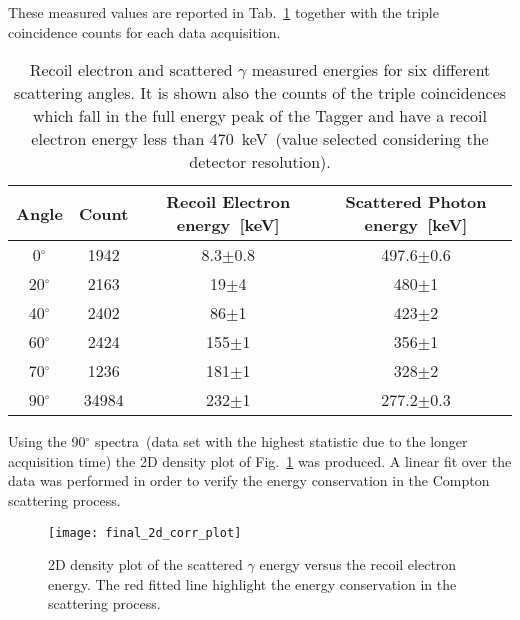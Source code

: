 These measured values are reported in Tab.~\ref{Tab:Scattering_energy} together with the triple coincidence counts for each data acquisition.

\begin{table}[H]
	\centering
	\begin{tabular}{cccc}
		\toprule
		\toprule
		Angle & Count & Recoil Electron energy~[keV] & Scattered Photon energy~[keV] \\
		\midrule
		  0$^\circ$ & 1942 &   8.3$\pm$0.8 &  497.6$\pm$0.6\\
		20$^\circ$ & 2163 &   19$\pm$4 &  480$\pm$1\\
		40$^\circ$ & 2402 &   86$\pm$1 &  423$\pm$2\\
		60$^\circ$ & 2424 & 155$\pm$1 &  356$\pm$1\\
		70$^\circ$ & 1236 & 181$\pm$1 &  328$\pm$2\\
		90$^\circ$ & 34984 & 232$\pm$1 &  277.2$\pm$0.3\\
		\bottomrule
		\bottomrule
	\end{tabular}
	\caption{Recoil electron and scattered $\gamma$ measured energies for six different scattering angles. It is shown also the counts of the triple coincidences which fall in the full energy peak of the Tagger and have a recoil electron energy less than 470~keV~(value selected considering the detector resolution).}
	\label{Tab:Scattering_energy}
\end{table}

Using the 90$^\circ$ spectra~(data set with the highest statistic due to the longer acquisition time) the 2D density plot of Fig.~\ref{Fig:Correlation_Plot} was produced.  A linear fit over the data was performed in order to verify the energy conservation in the Compton scattering process. 
\begin{figure}[h!]
	\centering
	\texttt{[image: final\_2d\_corr\_plot]}
	\caption{2D density plot of the scattered $\gamma$ energy versus the recoil electron energy. The red fitted line highlight the energy conservation in the scattering process.}
	\label{Fig:Correlation_Plot}
\end{figure}
